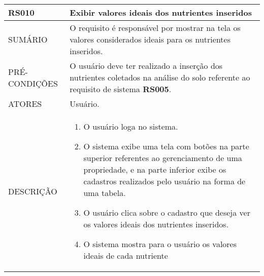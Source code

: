 \begin{longtable}[c]{@{}|p{4cm}|p{9cm}|@{}}
\hline
\begin{minipage}[t]{0.47\columnwidth}
\textbf{RS010}
\end{minipage} & \begin{minipage}[t]{0.47\columnwidth}
Exibir valores ideais dos nutrientes inseridos
\end{minipage}
\\\hline
\begin{minipage}[t]{0.47\columnwidth}
SUMÁRIO
\end{minipage} & \begin{minipage}[t]{0.47\columnwidth}
O requisito é responsável por mostrar na tela os valores considerados
ideais para os nutrientes inseridos.
\end{minipage}
\\\hline
\begin{minipage}[t]{0.47\columnwidth}
PRÉ-CONDIÇÕES
\end{minipage} & \begin{minipage}[t]{0.47\columnwidth}
O usuário deve ter realizado a inserção dos nutrientes coletados na
análise do solo referente ao requisito de sistema \textbf{RS005}.
\end{minipage}
\\\hline
\begin{minipage}[t]{0.47\columnwidth}
ATORES
\end{minipage} & \begin{minipage}[t]{0.47\columnwidth}
Usuário.
\end{minipage}
\\\hline
\begin{minipage}[t]{0.47\columnwidth}
DESCRIÇÃO
\end{minipage} & \begin{minipage}[t]{0.47\columnwidth}
\begin{enumerate}
\def\labelenumi{\arabic{enumi}.}
\itemsep1pt\parskip0pt\parsep0pt
\item
  O usuário loga no sistema.
\item
  O sistema exibe uma tela com botões na parte superior referentes ao
  gerenciamento de uma propriedade, e na parte inferior exibe os
  cadastros realizados pelo usuário na forma de uma tabela.
\item
  O usuário clica sobre o cadastro que deseja ver os valores ideais dos
  nutrientes inseridos.
\item
  O sistema mostra para o usuário os valores ideais de cada nutriente

\end{enumerate}
\end{minipage}
\end{longtable}

